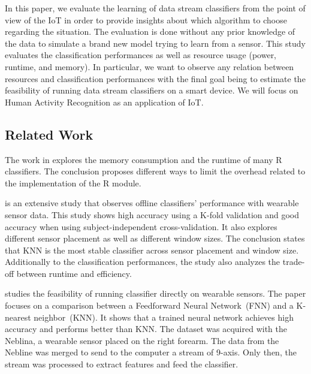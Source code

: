In this paper, we evaluate the learning of data stream classifiers from the
point of view of the IoT in order to provide insights about which algorithm
to choose regarding the situation. The evaluation is done without any prior
knowledge of the data to simulate a brand new model trying to learn from a
sensor. This study evaluates the classification performances as well as
resource usage (power, runtime, and memory). In particular, we want to observe
any relation between resources and classification performances with the final
goal being to estimate the feasibility of running data stream classifiers on a
smart device. We will focus on Human Activity Recognition as an application of IoT.


\subsection{Related Work}
The work in \cite{memory_consumption_machine_learning}
explores the memory consumption and
the runtime of many R classifiers. The conclusion proposes different ways to
limit the overhead related to the implementation of the R module.

\cite{Janidarmian_2017} is an extensive study that
observes offline classifiers' performance with
wearable sensor data. This study shows high
accuracy using a K-fold validation and good
accuracy when using subject-independent
cross-validation. It also explores different
sensor placement as well as different window
sizes. The conclusion states that KNN is the most
stable classifier across sensor placement and
window size. Additionally to the classification
performances, the study also analyzes the
trade-off between runtime and efficiency.

\cite{omid_2019} studies the feasibility of
running classifier directly on wearable sensors.
The paper focuses on a comparison between a
Feedforward Neural Network~(FNN) and a K-nearest
neighbor~(KNN). It shows that a trained neural
network achieves high accuracy and performs better
than KNN. The dataset was acquired with the
Neblina, a wearable sensor placed on the right
forearm. The data from the Nebline was merged to
send to the computer a stream of 9-axis. Only
then, the stream was processed to extract features
and feed the classifier.

